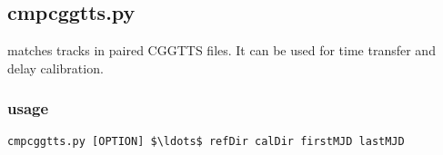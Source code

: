 \subsection{cmpcggtts.py}

\hypertarget{h:cmpcggtts}{}

 matches tracks in paired CGGTTS files. It can be used for time transfer and delay calibration. 

\subsubsection{usage}

\begin{lstlisting}[mathescape=true]
cmpcggtts.py [OPTION] $\ldots$ refDir calDir firstMJD lastMJD
\end{lstlisting}


